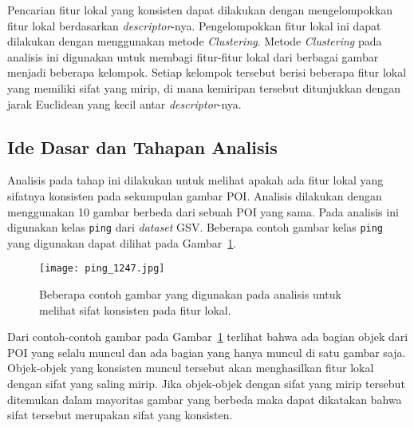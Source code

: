 Pencarian fitur lokal yang konsisten dapat dilakukan dengan mengelompokkan fitur lokal berdasarkan \textit{descriptor}-nya. Pengelompokkan fitur lokal ini dapat dilakukan dengan menggunakan metode \textit{Clustering}. Metode \textit{Clustering} pada analisis ini digunakan untuk membagi fitur-fitur lokal dari berbagai gambar menjadi beberapa kelompok. Setiap kelompok tersebut berisi beberapa fitur lokal yang memiliki sifat yang mirip, di mana kemiripan tersebut ditunjukkan dengan jarak Euclidean yang kecil antar \textit{descriptor}-nya. 

\subsection{Ide Dasar dan Tahapan Analisis}
Analisis pada tahap ini dilakukan untuk melihat apakah ada fitur lokal yang sifatnya konsisten pada sekumpulan gambar POI. Analisis dilakukan dengan menggunakan 10 gambar berbeda dari sebuah POI yang sama. Pada analisis ini digunakan kelas \texttt{ping} dari \textit{dataset} GSV. Beberapa contoh gambar kelas \texttt{ping} yang digunakan dapat dilihat pada Gambar~\ref{fig:contoh_ping}.
\begin{figure}[H]
	\centering
	\texttt{[image: ping\_1247.jpg]}	
	\caption{Beberapa contoh gambar yang digunakan pada analisis untuk melihat sifat konsisten pada fitur lokal.}
	\label{fig:contoh_ping}
\end{figure}
Dari contoh-contoh gambar pada Gambar~\ref{fig:contoh_ping} terlihat bahwa ada bagian objek dari POI yang selalu muncul dan ada bagian yang hanya muncul di satu gambar saja. Objek-objek yang konsisten muncul tersebut akan menghasilkan fitur lokal dengan sifat yang saling mirip. Jika objek-objek dengan sifat yang mirip tersebut ditemukan dalam mayoritas gambar yang berbeda maka dapat dikatakan bahwa sifat tersebut merupakan sifat yang konsisten.

